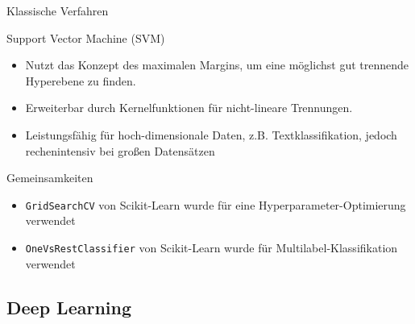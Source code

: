 \documentclass[aspectratio=169]{beamer} %
\begin{document}
\begin{frame}{Klassische Verfahren}
    \begin{block}{Support Vector Machine (SVM)}
        \begin{itemize}
            \item Nutzt das Konzept des maximalen Margins, um eine möglichst gut trennende Hyperebene zu finden.
            \item Erweiterbar durch Kernelfunktionen für nicht-lineare Trennungen.
            \item Leistungsfähig für hoch-dimensionale Daten, z.B. Textklassifikation, jedoch rechenintensiv bei großen Datensätzen
        \end{itemize}
    \end{block}
\end{frame}


\begin{frame}
    \begin{block}{Gemeinsamkeiten} %
        \begin{itemize}
            \item \texttt{GridSearchCV} von Scikit-Learn wurde für eine Hyperparameter-Optimierung verwendet
            \item \texttt{OneVsRestClassifier} von Scikit-Learn wurde für Multilabel-Klassifikation verwendet
        \end{itemize}
    \end{block}
\end{frame}

\subsection{Deep Learning}
\end{document}
